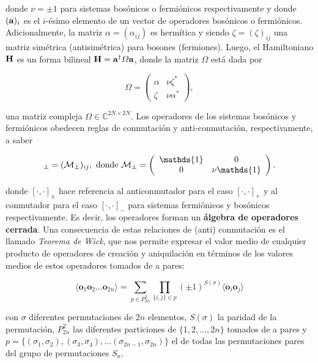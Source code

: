 \documentclass{report} %
\numberwithin{equation}{section}
\begin{document}
donde $\nu = \pm 1$ para sistemas bosónicos o fermiónicos respectivamente y donde $({\bf a})_i$ es el $i$-ésimo elemento de un vector de operadores bosónicos o fermiónicos.
Adicionalmente, la matriz $\alpha = (\alpha_{ij})$ es hermítica y siendo $\zeta = (\zeta)_{ij}$ una matriz simétrica (antisimétrica) para bosones (fermiones). Luego, el Hamiltoniano ${\bf H}$ es un forma bilineal ${\bf H} = {\bf a}^{\dagger} \Omega {\bf a}$, donde la matriz $\Omega$ está dada por

\begin{equation}
    \Omega = \left(\begin{array}{cc}
      \alpha  & \nu \zeta^{*}  \\
      \zeta   & \nu \alpha^{*} 
    \end{array}\right),
\end{equation}

una matriz compleja $\Omega \in \mathds{C}^{2N \times 2N}$. Los operadores de los sistemas bosónicos y fermiónicos obedecen reglas de conmutación y anti-conmutación, respectivamente, a saber

\begin{align}
    [{\bf a}_i, {\bf a}^{\dagger}_j]_{\pm} = (\mathcal{M}_{\pm})_{ij}, \textnormal{ donde } \mathcal{M}_{\pm}= \left(\begin{array}{cc}
        \mathds{1} & 0  \\
        0 & \nu \mathds{1} 
    \end{array}\right).
\end{align}

donde $[\cdot, \cdot]_{\pm}$ hace referencia al anticonmutador para el caso $[\cdot, \cdot]_+$ y al conmutador para el caso $[\cdot, \cdot]_-$ para sistemas fermiónicos y bosónicos respectivamente. Es decir, los operadores forman un \textbf{álgebra de operadores cerrada}. Una consecuencia de estas relaciones de (anti) conmutación es el llamado \emph{Teorema de Wick}, que nos permite expresar el valor medio de cualquier producto de operadores de creación y aniquilación en términos de los valores medios de estos operadores tomados de a pares:

$$
\langle \mathbf{o}_1 \mathbf{o}_2\ldots \mathbf{o}_{2n} \rangle = \sum_{p\in P_{2n}^2} \prod_{\{i,j\}\in p} (\pm 1)^{S(\sigma)}
 \langle \mathbf{o}_{i} \mathbf{o}_{j} \rangle 
$$

con $\sigma$ diferentes permutaciones de $2n$ elementos, $S(\sigma)$ la paridad de la permutación, ${P}_{2n}^2$ las diferentes particiones de $\{1,2,\ldots, 2n\}$ tomados de a pares y $p=\{(\sigma_1,\sigma_2),(\sigma_3,\sigma_4),\ldots (\sigma_{2n-1},\sigma_{2n})\}$ el de todas las permutaciones pares del grupo de permutaciones $S_n$.
    
\end{document}
